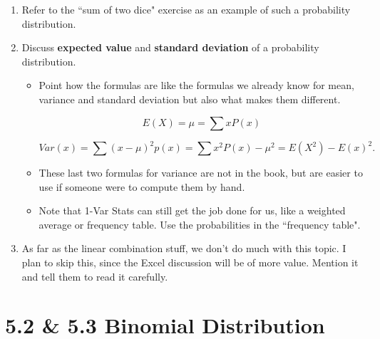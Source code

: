 \documentclass{article}
\begin{document}
\begin{enumerate}

    \item Refer to the ``sum of two dice" exercise as an example of such a probability distribution.
    
    \item Discuss {\bf expected value} and {\bf standard deviation} of a probability distribution. 
    
        \begin{itemize}
        
            \item Point how the formulas are like the formulas we already know for mean, variance and standard deviation but also what makes them different.
            
            $$E(X) = \mu = \sum xP(x)$$
            
            $$Var(x) = \sum (x-\mu)^2p(x) = \sum x^2P(x) - \mu^2 = E(X^2) - E(x)^2.$$
            
            \item These last two formulas for variance are not in the book, but are easier to use if someone were to compute them by hand.
            
            \item Note that 1-Var Stats can still get the job done for us, like a weighted average or frequency table. Use the probabilities in the ``frequency table".
            
        \end{itemize}
        
    \item As far as the linear combination stuff, we don’t do much with this topic. I plan to skip this, since the Excel discussion will be of more value. Mention it and tell them to read it carefully.

\end{enumerate}

\section*{5.2 \& 5.3 Binomial Distribution}
\end{document}
